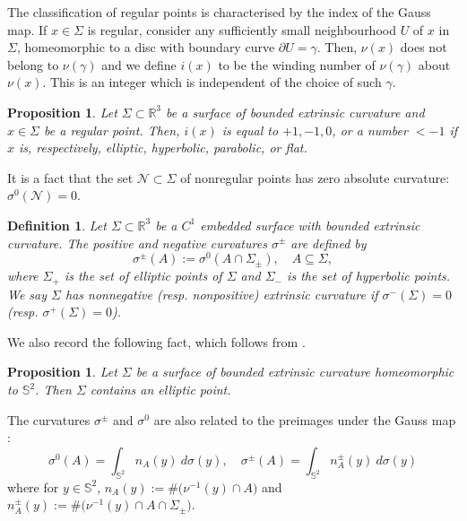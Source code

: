 \documentclass[12pt]{article}
\newcommand{\R}{\mathbb{R}}
\theoremstyle{plain}
\newtheorem{proposition}[theorem]{Proposition}
\newtheorem{definition}[theorem]{Definition}
\numberwithin{equation}{section}
\begin{document}
The classification of regular points is characterised by the index of the Gauss map. If $x \in \Sigma$ is regular, consider any sufficiently small neighbourhood $U$ of $x$ in $\Sigma$, homeomorphic to a disc with boundary curve $\partial U = \gamma$. Then, $\nu(x)$ does not belong to $\nu(\gamma)$ and we define $i(x)$ to be the winding number of $\nu(\gamma)$ about $\nu(x)$. This is an integer which is independent of the choice of such $\gamma$.

\begin{proposition} {\cite[Lemma, p. 594]{pogorelov_73}} \label{prop:index_at_regular_points}
    Let $\Sigma \subset \R^3$ be a surface of bounded extrinsic curvature and $x \in \Sigma$ be a regular point. Then, $i(x)$ is equal to $+1, -1, 0$, or a number $<-1$ if $x$ is, respectively, elliptic, hyperbolic, parabolic, or flat.
\end{proposition}


It is a fact \cite[Theorem 4, p. 591]{pogorelov_73} that the set $\mathcal{N} \subset \Sigma$ of nonregular points has zero absolute curvature: $\sigma^0(\mathcal{N}) = 0$. 

\begin{definition}
    Let $\Sigma \subset \R^3$ be a $C^1$ embedded surface with bounded extrinsic curvature. The positive and negative curvatures $\sigma^\pm$ are defined by
    \begin{equation*}
        \sigma^\pm(A) := \sigma^0(A\cap\Sigma_\pm), \quad A \subseteq \Sigma,
    \end{equation*}
    where $\Sigma_+$ is the set of elliptic points of $\Sigma$ and $\Sigma_-$ is the set of hyperbolic points. We say $\Sigma$ has nonnegative (resp. nonpositive) extrinsic curvature if $\sigma^-(\Sigma) = 0$ (resp. $\sigma^+(\Sigma) = 0$).
\end{definition}

We also record the following fact, which follows from \cite[Theorem 13, p. 601]{pogorelov_73}.
\begin{proposition} \label{prop:elliptic_exists}
    Let $\Sigma$ be a surface of bounded extrinsic curvature homeomorphic to $\mathbb{S}^2$. Then $\Sigma$ contains an elliptic point.
\end{proposition}

The curvatures $\sigma^\pm$ and $\sigma^0$ are also related to the preimages under the Gauss map \cite[Theorem 7, p. 594]{pogorelov_73}:
\begin{equation} \label{eq:curvature_and_indicatrix}
    \sigma^0(A)= \int_{\mathbb{S}^2} n_A(y)~d\sigma(y), \quad \sigma^\pm(A) = \int_{\mathbb{S}^2} n_A^\pm(y)~d\sigma(y)
\end{equation}
where for $y \in \mathbb{S}^2$, $n_A(y) := \#\big(\nu^{-1}(y) \cap A\big)$ and $n_A^\pm(y) := \#\big( \nu^{-1}(y) \cap A \cap \Sigma_\pm \big)$.
\end{document}
